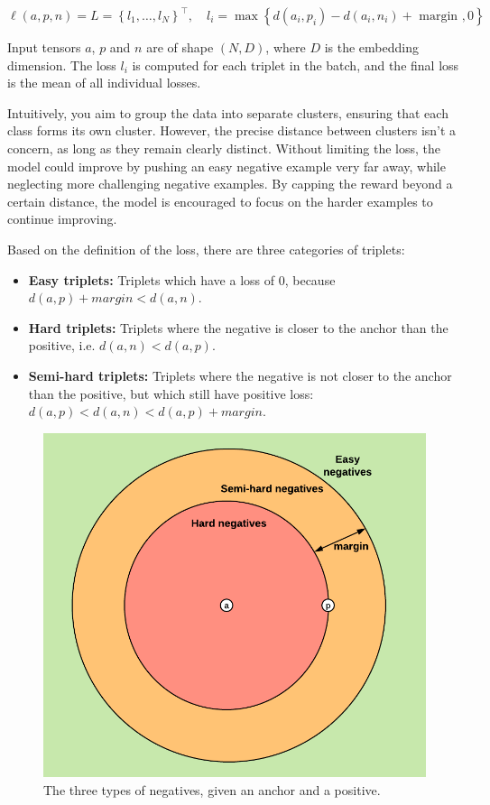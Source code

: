$\ell(a, p, n)=L=\left\{l_1, \ldots, l_N\right\}^{\top}, \quad l_i=\max \left\{d\left(a_i, p_i\right)-d\left(a_i, n_i\right)+\text { margin }, 0\right\}$

Input tensors $a$, $p$ and $n$ are of shape $(N, D)$, where $D$ is the embedding dimension. The loss $l_i$ is computed for each triplet in the batch, and the final loss is the mean of all individual losses.

Intuitively, you aim to group the data into separate clusters, ensuring that each class forms its own cluster. However, the precise distance between clusters isn't a concern, as long as they remain clearly distinct. Without limiting the loss, the model could improve by pushing an easy negative example very far away, while neglecting more challenging negative examples. By capping the reward beyond a certain distance, the model is encouraged to focus on the harder examples to continue improving.

Based on the definition of the loss, there are three categories of triplets:
\begin{itemize}
  \item \textbf{Easy triplets:} Triplets which have a loss of $0$, because $d(a, p) + margin < d(a, n)$.
  \item \textbf{Hard triplets:} Triplets where the negative is closer to the anchor than the positive, i.e. $d(a, n) < d(a, p)$.
  \item \textbf{Semi-hard triplets:} Triplets where the negative is not closer to the anchor than the positive, but which still have positive loss: $d(a, p) < d(a, n) < d(a, p) + margin$.
\end{itemize}

\begin{figure}[]
  \centering
  \includegraphics[width=0.5\columnwidth]{images/negative_types.png}
  \caption{The three types of negatives, given an anchor and a positive.}
  \label{fig:negative_types}
\end{figure}

